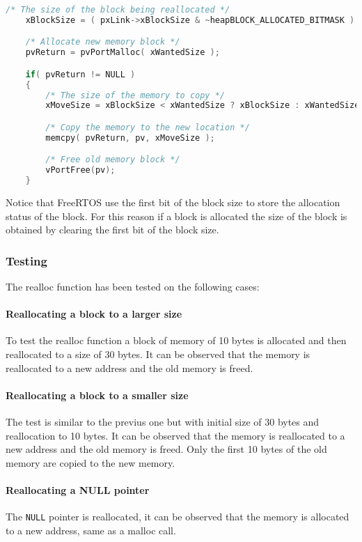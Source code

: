     \begin{codebox}
    \begin{lstlisting}[language=c]
    /* The size of the block being reallocated */
    xBlockSize = ( pxLink->xBlockSize & ~heapBLOCK_ALLOCATED_BITMASK ) - xHeapStructSize;

    /* Allocate new memory block */
    pvReturn = pvPortMalloc( xWantedSize );

    if( pvReturn != NULL )
    {
        /* The size of the memory to copy */
        xMoveSize = xBlockSize < xWantedSize ? xBlockSize : xWantedSize;

        /* Copy the memory to the new location */
        memcpy( pvReturn, pv, xMoveSize );

        /* Free old memory block */
        vPortFree(pv);
    } 
    \end{lstlisting}
    \end{codebox}

    Notice that FreeRTOS use the first bit of the block size to store the allocation status of the block. For this reason if a block is allocated the size of the block is obtained by clearing the first bit of the block size.

    \subsubsection{Testing}
    The realloc function has been tested on the following cases:

    \paragraph{Reallocating a block to a larger size}
    To test the realloc function a block of memory of 10 bytes is allocated and then reallocated to a size of 30 bytes. It can be observed that the memory is reallocated to a new address and the old memory is freed.

    \paragraph{Reallocating a block to a smaller size}
    The test is similar to the previus one but with initial size of 30 bytes and reallocation to 10 bytes. It can be observed that the memory is reallocated to a new address and the old memory is freed. Only the first 10 bytes of the old memory are copied to the new memory.

    \paragraph{Reallocating a NULL pointer}
    The \texttt{NULL} pointer is reallocated, it can be observed that the memory is allocated to a new address, same as a malloc call.

